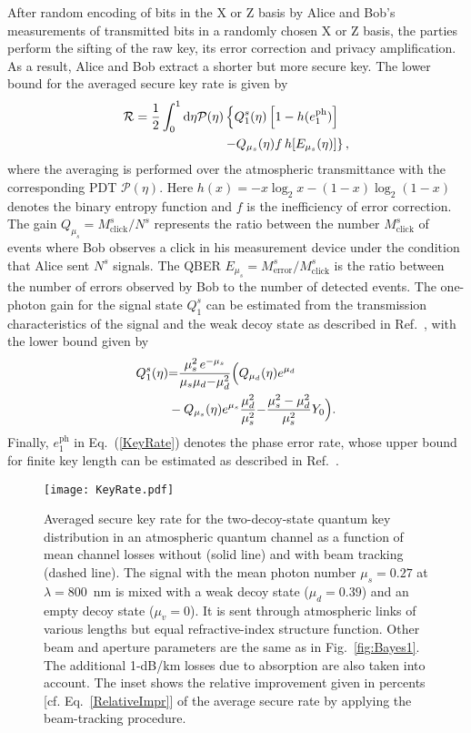 \documentclass[aps,pra,twocolumn,a4paper,nofootinbib,preprintnumbers] {revtex4-1}
\newcommand{\D}{{\rm{d}}}
\begin{document}
      After random encoding of bits in the X or Z basis by Alice and Bob's measurements of transmitted bits in a randomly chosen X or Z  basis, the parties perform the sifting of the raw key, its error correction and privacy amplification.
      As a result, Alice and Bob  extract a shorter but more secure key.
      The lower bound for the averaged secure key rate is given by  \cite{Ma2006}
	      \begin{align}\label{KeyRate}
	      \mathcal{R}=\frac{1}{2}\int_0^1\D\eta & \mathcal{P}(\eta)\left\{Q_{1}^s(\eta)\left[1-h(e_1^{\mathrm{ph}})\right]\right.\nonumber\\
	      & \left.\qquad-Q_{\mu_s}(\eta) f\, h[E_{\mu_s}(\eta)]\right\},
	      \end{align}
      where the   averaging is performed over the  atmospheric transmittance with the corresponding PDT $\mathcal{P}(\eta)$.
      Here $h(x){=}-x\log_2x{-}(1{-}x)\log_2(1{-}x)$ denotes the binary entropy function and $f$ is the inefficiency of error correction.
      The gain  $Q_{\mu_s}=M_{\mathrm{click}}^s/N^s$ represents the ratio between the number $M_{\mathrm{click}}^s$ of events where Bob observes a click in his measurement device under the condition that Alice sent $N^s$ signals.
      The QBER $E_{\mu_s}{=}M_{\mathrm{error}}^s/M_{\mathrm{click}}^s$ is the ratio between the number of errors observed by Bob to the number of detected events.
      The one-photon gain for the signal state $Q_{1}^s$ can be estimated from the transmission characteristics of the signal and the weak decoy state as described in Ref.~\cite{Ma2006}, with the  lower bound given by
	      \begin{align}
		Q_1^s(\eta)&{=}\frac{\mu_s^2\,e^{-\mu_s}}{\mu_s\mu_d{-}\mu_d^2} \Bigl(Q_{\mu_d}(\eta)e^{\mu_d}\nonumber\\
		&-Q_{\mu_s}(\eta)e^{\mu_s}\frac{\mu_d^2}{\mu_s^2}{-}\frac{\mu_s^2-\mu_d^2}{\mu_s^2}Y_0\Bigr).
	      \end{align}
      Finally, $e_1^{\mathrm{ph}}$ in Eq.~(\ref{KeyRate}) denotes the phase error rate, whose upper bound for finite key length can be estimated as described in Ref.~\cite{Fung}.


\begin{figure}[ht]
 \texttt{[image: KeyRate.pdf]}
 \caption{\label{fig:Bayes3} Averaged secure key rate for the two-decoy-state quantum key distribution in an atmospheric  quantum channel as a function of mean channel losses without (solid line) and with  beam tracking (dashed line).
 The signal  with the mean photon number $\mu_s{=}0.27$ at $\lambda{=}800$~nm is mixed with a weak decoy state  ($\mu_d{=}0.39$) and an empty decoy state  ($\mu_v{=}0$).
 It is sent through atmospheric links of various lengths but equal refractive-index structure function.
 Other beam and aperture   parameters are the same as in Fig.~\ref{fig:Bayes1}.
 The additional 1-dB/km losses due to  absorption are also taken into account.
 The inset shows the relative improvement given in percents [cf. Eq.~\eqref{RelativeImpr}] of the average secure rate by applying the beam-tracking procedure.
}
\end{figure}
\end{document}
